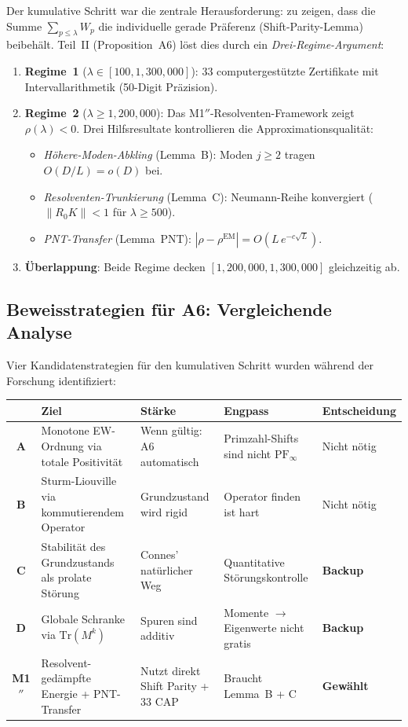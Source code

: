 \documentclass[12pt,a4paper]{article}
\theoremstyle{definition}
\theoremstyle{remark}
\begin{document}
Der kumulative Schritt war die zentrale Herausforderung: zu zeigen, dass die Summe $\sum_{p \leq \lambda} W_p$ die individuelle gerade Präferenz (Shift-Parity-Lemma) beibehält. Teil~II (Proposition~A6) löst dies durch ein \emph{Drei-Regime-Argument}:

\begin{enumerate}
  \item \textbf{Regime~1} ($\lambda \in [100, 1{,}300{,}000]$): $33$ computergestützte Zertifikate mit Intervallarithmetik (50-Digit Präzision).
  \item \textbf{Regime~2} ($\lambda \geq 1{,}200{,}000$): Das M1$''$-Resolventen-Framework zeigt $\rho(\lambda) < 0$. Drei Hilfsresultate kontrollieren die Approximationsqualität:
  \begin{itemize}
    \item \emph{Höhere-Moden-Abkling} (Lemma~B): Moden $j \geq 2$ tragen $O(D/L) = o(D)$ bei.
    \item \emph{Resolventen-Trunkierung} (Lemma~C): Neumann-Reihe konvergiert ($\|R_0 K\| < 1$ für $\lambda \geq 500$).
    \item \emph{PNT-Transfer} (Lemma~PNT): $|\rho - \rho^{\mathrm{EM}}| = O(L\,e^{-c\sqrt{L}})$.
  \end{itemize}
  \item \textbf{Überlappung}: Beide Regime decken $[1{,}200{,}000, 1{,}300{,}000]$ gleichzeitig ab.
\end{enumerate}

\subsection{Beweisstrategien für A6: Vergleichende Analyse}

Vier Kandidatenstrategien für den kumulativen Schritt wurden während der Forschung identifiziert:

\begin{center}
\small
\renewcommand{\arraystretch}{1.25}
\begin{tabular}{c|p{2.5cm}|p{2.8cm}|p{2.8cm}|l}
 & \textbf{Ziel} & \textbf{Stärke} & \textbf{Engpass} & \textbf{Entscheidung} \\\hline
\textbf{A} & Monotone EW-Ordnung via totale Positivität & Wenn gültig: A6 automatisch & Primzahl-Shifts sind nicht $\mathrm{PF}_\infty$ & Nicht nötig \\[4pt]
\textbf{B} & Sturm-Liouville via kommutierendem Operator & Grundzustand wird rigid & Operator finden ist hart & Nicht nötig \\[4pt]
\textbf{C} & Stabilität des Grundzustands als prolate Störung & Connes' natürlicher Weg & Quantitative Störungskontrolle & \textbf{Backup} \\[4pt]
\textbf{D} & Globale Schranke via $\mathrm{Tr}(M^k)$ & Spuren sind additiv & Momente $\to$ Eigenwerte nicht gratis & \textbf{Backup} \\[4pt]\hline
\textbf{M1$''$} & Resolvent-gedämpfte Energie + PNT-Transfer & Nutzt direkt Shift Parity + 33 CAP & Braucht Lemma~B + C & \textbf{Gewählt}
\end{tabular}
\end{center}
\end{document}
